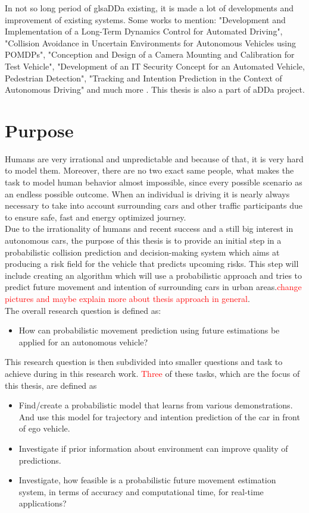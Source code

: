 In not so long period of gls{aDDa} existing, it is made a lot of developments and improvement of existing systems. Some works to mention: "Development and Implementation of a Long-Term Dynamics Control for Automated Driving", "Collision Avoidance in Uncertain Environments for Autonomous Vehicles using POMDPs", "Conception and Design of a Camera Mounting and Calibration for Test Vehicle", "Development of an IT Security Concept for an Automated Vehicle, Pedestrian Detection", "Tracking and Intention Prediction in the Context of Autonomous Driving" and much more \textcolor{red}{\cite{aDDa}}. This thesis is also a part of \gls{aDDa} project.

\section{Purpose}

Humans are very irrational and unpredictable and because of that, it is very hard to model them. Moreover, there are no two exact same people, what makes the task to model human behavior almost impossible, since every possible scenario as an endless possible outcome. When an individual is driving it is nearly always necessary to take into account surrounding cars and other traffic participants due to ensure safe, fast and energy optimized journey. \\

Due to the irrationality of humans and recent success and a still big interest in autonomous cars, the purpose of this thesis is to provide an initial step in a probabilistic collision prediction and decision-making system which aims at producing a risk field for the vehicle that predicts
upcoming risks. This step will include creating an algorithm which will use a probabilistic approach and tries to predict future movement and intention of surrounding cars in urban areas.\textcolor{red}{change pictures and maybe explain more about thesis approach in general}.\\

The overall research question is defined
as:
\begin{itemize}
	\item How can probabilistic movement prediction using future estimations be applied for an autonomous vehicle?
\end{itemize}

This research question is then subdivided into smaller questions and task to achieve during in this research work. \textcolor{red}{Three} of these tasks, which are the focus of this thesis, are defined as
\begin{itemize}
	\item Find/create a probabilistic model that learns from various demonstrations. And use this model for trajectory and intention prediction of the car in front of ego vehicle.
	\item Investigate if prior information about environment can improve quality of predictions.
	\item Investigate, how feasible is a probabilistic future movement estimation system, in terms of accuracy and computational time, for real-time applications?
\end{itemize}

